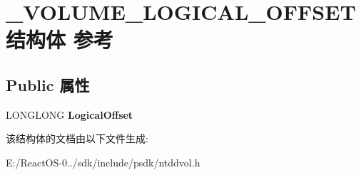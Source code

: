 \hypertarget{struct___v_o_l_u_m_e___l_o_g_i_c_a_l___o_f_f_s_e_t}{}\section{\+\_\+\+V\+O\+L\+U\+M\+E\+\_\+\+L\+O\+G\+I\+C\+A\+L\+\_\+\+O\+F\+F\+S\+E\+T结构体 参考}
\label{struct___v_o_l_u_m_e___l_o_g_i_c_a_l___o_f_f_s_e_t}
\subsection*{Public 属性}
\begin{DoxyCompactItemize}
\item 
\mbox{\label{struct___v_o_l_u_m_e___l_o_g_i_c_a_l___o_f_f_s_e_t_aa9dc0f156923875a3e64100da362e84b}} 
L\+O\+N\+G\+L\+O\+NG {\bfseries Logical\+Offset}
\end{DoxyCompactItemize}


该结构体的文档由以下文件生成\+:\begin{DoxyCompactItemize}
\item 
E\+:/\+React\+O\+S-\/0../sdk/include/psdk/ntddvol.\+h\end{DoxyCompactItemize}
